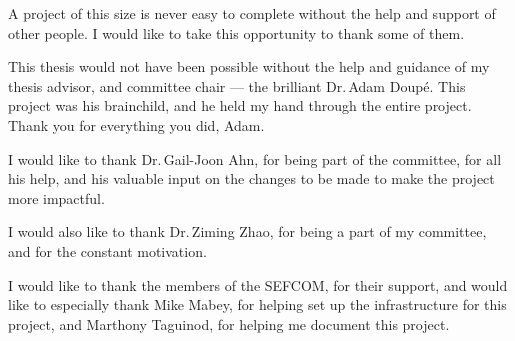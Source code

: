 A project of this size is never easy to complete without the help and support of other people. I would like to take this opportunity to thank some of them.

This thesis would not have been possible without the help and guidance of my thesis advisor, and committee chair --- the brilliant Dr.\,Adam Doup\'{e}.
This project was his brainchild, and he held my hand through the entire project. Thank you for everything you did, Adam.

I would like to thank Dr.\,Gail-Joon Ahn, for being part of the committee, for all his help, and his valuable input on the changes to be made to make the project more impactful.

I would also like to thank Dr.\,Ziming Zhao, for being a part of my committee, and for the constant motivation.

I would like to thank the members of the SEFCOM, for their support, and would like to especially thank Mike Mabey, for helping set up the infrastructure for this project, and Marthony Taguinod, for helping me document this project.